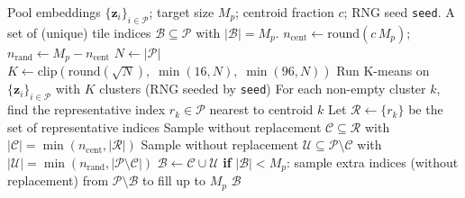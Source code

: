 \begin{algorithm}[H]
\caption{\textsc{SelectWithKMeansAndRandom} (helper)}
\label{alg:sampling_helper}
\begin{algorithmic}[1]
\REQUIRE Pool embeddings $\{\mathbf{z}_i\}_{i\in\mathcal{P}}$; target size $M_p$; centroid fraction $c$; RNG seed \texttt{seed}.
\ENSURE A set of (unique) tile indices $\mathcal{B}\subseteq\mathcal{P}$ with $|\mathcal{B}|=M_p$.
\STATE $n_{\text{cent}} \leftarrow \mathrm{round}(c\,M_p)$; \;\; $n_{\text{rand}} \leftarrow M_p-n_{\text{cent}}$
\STATE $N \leftarrow |\mathcal{P}|$
\STATE $K \leftarrow \mathrm{clip}\!\left(\mathrm{round}(\sqrt{N}),\; \min(16,N),\; \min(96,N)\right)$
\STATE Run K-means on $\{\mathbf{z}_i\}_{i\in\mathcal{P}}$ with $K$ clusters (RNG seeded by \texttt{seed})
\STATE For each non-empty cluster $k$, find the representative index $r_k\in\mathcal{P}$ nearest to centroid $k$
\STATE Let $\mathcal{R} \leftarrow \{r_k\}$ be the set of representative indices
\STATE Sample without replacement $\mathcal{C} \subseteq \mathcal{R}$ with $|\mathcal{C}|=\min(n_{\text{cent}},|\mathcal{R}|)$
\STATE Sample without replacement $\mathcal{U} \subseteq \mathcal{P}\setminus \mathcal{C}$ with $|\mathcal{U}|=\min(n_{\text{rand}},|\mathcal{P}\setminus \mathcal{C}|)$
\STATE $\mathcal{B} \leftarrow \mathcal{C}\cup \mathcal{U}$
\STATE \textbf{if} $|\mathcal{B}| < M_p$: sample extra indices (without replacement) from $\mathcal{P}\setminus \mathcal{B}$ to fill up to $M_p$
\RETURN $\mathcal{B}$
\end{algorithmic}
\end{algorithm}

